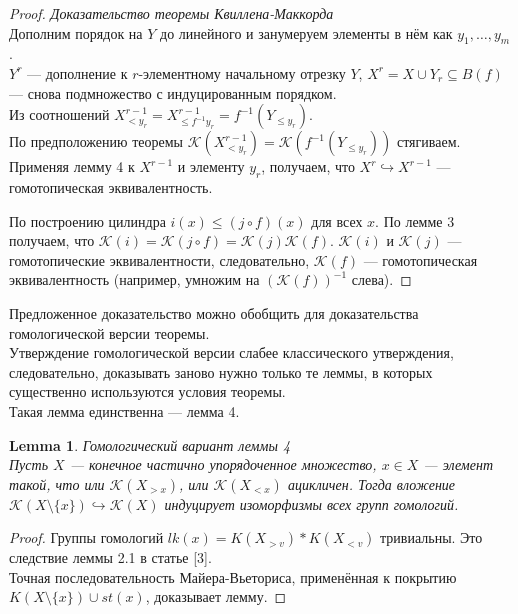 \documentclass[a4paper, 12pt]{article}
\newtheorem{lemma}{Lemma}
\theoremstyle{definition}
\theoremstyle{remark}
\begin{document}
\begin{proof}
  \textit{Доказательство теоремы Квиллена-Маккорда}\\
  Дополним порядок на $Y$ до линейного и занумеруем элементы в нём как $y_1,\ldots,y_m$.\\
  $Y^r$ --- дополнение к $r$-элементному начальному отрезку $Y$, $X^r = X \cup Y_r \subseteq B(f)$ --- снова подмножество с индуцированным порядком.\\
  Из соотношений $X^{r-1}_{<y_r} = X^{r-1}_{\leqslant f^{-1}{y_r}} = f^{-1}(Y_{\leqslant y_r})$.\\

  По предположению теоремы $\mathcal{K}(X^{r-1}_{<y_r}) = \mathcal{K}(f^{-1}(Y_{\leqslant y_r}))$ стягиваем.
  Применяя лемму 4 к $X^{r-1}$ и элементу $y_r$, получаем, что $X^r \hookrightarrow X^{r-1}$ --- гомотопическая эквивалентность.

  По построению цилиндра $i(x) \leqslant (j \circ f)(x)$ для всех $x$. По лемме 3 получаем, что $\mathcal{K}(i) = \mathcal{K}(j \circ f) = \mathcal{K}(j)\mathcal{K}(f)$. $\mathcal{K}(i)$ и $\mathcal{K}(j)$ --- гомотопические эквивалентности, следовательно, $\mathcal{K}(f)$ --- гомотопическая эквивалентность (например, умножим на $(\mathcal{K}(f))^{-1}$ слева).
\end{proof}

Предложенное доказательство можно обобщить для доказательства гомологической версии теоремы.\\
Утверждение гомологической версии слабее классического утверждения, следовательно, доказывать заново нужно только те леммы, в которых существенно используются условия теоремы.\\
Такая лемма единственна --- лемма 4.

\begin{lemma}
  \textit{Гомологический вариант леммы 4}\\
  Пусть $X$ --- конечное частично упорядоченное множество, $x \in X$ --- элемент такой, что или $\mathcal{K}(X_{>x})$, или $\mathcal{K}(X_{<x})$ ацикличен. Тогда вложение $\mathcal{K}(X\setminus \{x\}) \hookrightarrow \mathcal{K}(X)$ индуцирует изоморфизмы всех групп гомологий.
\end{lemma}
\begin{proof}
  Группы гомологий $lk(x) = K(X_{>v}) * K(X_{<v})$ тривиальны. Это следствие леммы 2.1 в статье [3].\\
  Точная последовательность Майера-Вьеториса, применённая к покрытию $K(X \setminus \{x\}) \cup st(x)$, доказывает лемму.
\end{proof}
\end{document}
